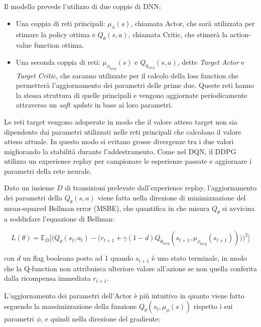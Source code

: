 Il modello prevede l'utilizzo di due coppie di DNN: 
\begin{itemize}
    \item Una coppia di reti principali: $\mu_{\phi}(s)$, chiamata Actor, che sarà utilizzata per stimare la policy ottima e $Q_{\theta}(s,a)$, chiamata Critic, che stimerà la action-value function ottima.
\item Una seconda coppia di reti: $\mu_{\phi_{targ}}(s)$ e $Q_{\theta_{targ}}(s,a)$, dette \textit{Target Actor} e \textit{Target Critic}, che saranno utilizzate per il calcolo della loss function che permetterà l'aggiornamento dei parametri delle prime due. Queste reti hanno la stessa struttura di quelle principali e vengono aggiornate periodicamente attraverso un \textit{soft update} in base ai loro parametri.
\end{itemize}

Le reti target vengono adoperate in modo che il valore atteso target non sia dipendente dai parametri utilizzati nelle reti principali che calcolano il valore atteso attuale. In questo modo si evitano grosse divergenze tra i due valori migliorando la stabilità durante l’addestramento. Come nel DQN, il DDPG utilizza un experience replay per campionare le esperienze passate e aggiornare i parametri della rete neurale.
\newline

Dato un insieme $D$ di transizioni prelevate dall'experience replay, l'aggiornamento dei parametri della $Q_{\theta}(s,a)$ viene fatta nella direzione di minimizzazione del mean-squared Bellman error (MSBE), che quantifica in che misura $Q_{\theta}$ si avvicina a soddisfare l'equazione di Bellman:

\begin{equation}\label{criticlossddpg}
  L(\theta) = \mathbb{E}_D 
	\Bigg[ 
	\bigg(
	Q_{\theta}(s_t,a_t) - 
	\Big(
	r_{t+1} + \gamma(1-d)Q_{\theta_{targ}}(s_{t+1},\mu_{\phi_{targ}}(s_{t+1}))
	\Big)
	\bigg)^2
	\Bigg]  
\end{equation}

con $d$ un flag booleano posto ad 1 quando $s_{t+1}$ è uno stato terminale, in modo che la Q-function non attribuisca ulteriore valore all'azione se non quella conferita dalla ricompensa immediata $r_{t+1}$.
\newline

L'aggiornamento dei parametri dell'Actor è più intuitivo in quanto viene fatto seguendo la massimizzazione della funzione $Q_{\theta}(s_t,\mu_{\phi}(s))$ rispetto i sui parametri $\phi$, e quindi nella direzione del gradiente:

